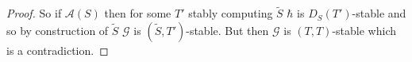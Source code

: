 \documentclass{amsart}  %
\numberwithin{equation}{section}
\newtheorem{remark}[equation]{Remark}
\theoremstyle{definition}
\theoremstyle{remark}
\begin{document}
{\begin{proof}
So if $\mathcal{A}(S)$ then for some $T'$ stably computing $\widetilde{S} $ 
$\hbar$ is $D _{S} (T') $-stable and so
by construction of $\widetilde{S} $  $\mathcal{G}$ is $(\widetilde{S}, T') $-stable. But then $\mathcal{G}$ is $(T,T)$-stable which is a contradiction.  
\end{proof}
%
}
\end{document}
